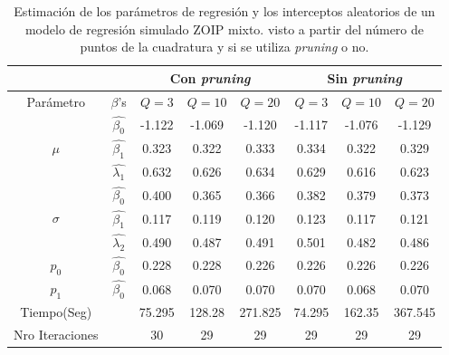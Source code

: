 \begin{table}[!hbt]
{\scriptsize
\begin{center}
\begin{tabular}{|c|c|c|c|c|c|c|c|}\hline
& & \multicolumn{3}{|c|}{Con \textit{pruning}} & \multicolumn{3}{|c|}{Sin \textit{pruning}} \\ \hline
Par\'{a}metro & $\beta$'s & $Q=3$ & $Q=10$ & $Q=20$ & $Q=3$ & $Q=10$ & $Q=20$ \\ \hline \hline
\multirow{3}{*}{$\mu$} & $\hat{\beta_0}$ & -1.122	& -1.069	& -1.120	& -1.117	& -1.076	& -1.129 \\ 
& $\hat{\beta_1}$ & 0.323	&0.322	&0.333	&0.334	&0.322	&0.329 \\
& $\hat{\lambda_1}$ & 0.632	&0.626	&0.634	&0.629	&0.616	&0.623 \\ \hline
\multirow{3}{*}{$\sigma$} & $\hat{\beta_0}$ & 0.400	&0.365	&0.366	&0.382	&0.379	&0.373 \\ 
& $\hat{\beta_1}$ & 0.117	&0.119	&0.120	&0.123	&0.117	&0.121 \\
& $\hat{\lambda_2}$ & 0.490	&0.487	&0.491	&0.501	&0.482	&0.486 \\ \hline
$p_0$& $\hat{\beta_0}$ &0.228	&0.228	&0.226	&0.226	&0.226	&0.226 \\ \hline
$p_1$& $\hat{\beta_0}$ &0.068	&0.070	&0.070	&0.070	&0.068	&0.070 \\ \hline
Tiempo(Seg)& &75.295	&128.28	&271.825	&74.295	&162.35	&367.545 \\ \hline
Nro Iteraciones& &30	&29	&29	&29	&29	&29 \\ \hline
\end{tabular}
\caption{Estimaci\'{o}n de los par\'{a}metros de regresi\'{o}n y los interceptos aleatorios de un modelo de regresi\'{o}n simulado ZOIP mixto. visto a partir del n\'{u}mero de puntos de la cuadratura y si se utiliza \textit{pruning} o no.}
\label{T_Sim_mix_ncua}
\end{center}
}
\end{table}

